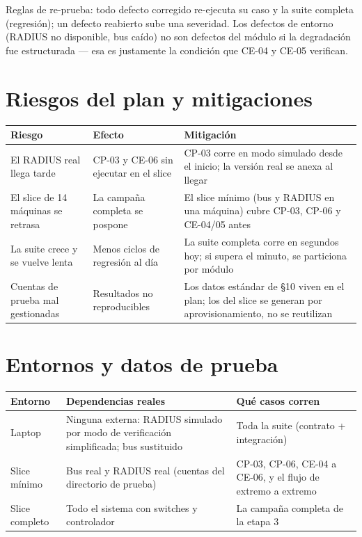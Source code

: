 \documentclass[11pt,a4paper]{article}
\begin{document}
Reglas de re-prueba: todo defecto corregido re-ejecuta su caso y la suite completa (regresión); un defecto reabierto sube una severidad. Los defectos de entorno (RADIUS no disponible, bus caído) no son defectos del módulo si la degradación fue estructurada --- esa es justamente la condición que CE-04 y CE-05 verifican.

\section{Riesgos del plan y mitigaciones}

\begin{longtable}{p{5.2cm}p{4.2cm}p{4.6cm}}
\toprule
\textbf{Riesgo} & \textbf{Efecto} & \textbf{Mitigación}\\
\midrule
El RADIUS real llega tarde & CP-03 y CE-06 sin ejecutar en el slice & CP-03 corre en modo simulado desde el inicio; la versión real se anexa al llegar\\
El slice de 14 máquinas se retrasa & La campaña completa se pospone & El slice mínimo (bus y RADIUS en una máquina) cubre CP-03, CP-06 y CE-04/05 antes\\
La suite crece y se vuelve lenta & Menos ciclos de regresión al día & La suite completa corre en segundos hoy; si supera el minuto, se particiona por módulo\\
Cuentas de prueba mal gestionadas & Resultados no reproducibles & Los datos estándar de §10 viven en el plan; los del slice se generan por aprovisionamiento, no se reutilizan\\
\bottomrule
\end{longtable}

\section{Entornos y datos de prueba}



\begin{longtable}{p{3.2cm}p{5.4cm}p{5.4cm}}
\toprule
\textbf{Entorno} & \textbf{Dependencias reales} & \textbf{Qué casos corren}\\
\midrule
Laptop & Ninguna externa: RADIUS simulado por modo de verificación simplificada; bus sustituido & Toda la suite (contrato + integración)\\
Slice mínimo & Bus real y RADIUS real (cuentas del directorio de prueba) & CP-03, CP-06, CE-04 a CE-06, y el flujo de extremo a extremo\\
Slice completo & Todo el sistema con switches y controlador & La campaña completa de la etapa 3\\
\bottomrule
\end{longtable}
\end{document}
